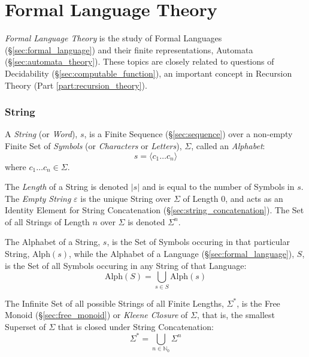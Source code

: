 \part{Formal Language Theory}\label{part:formal_language}
\cite{hammel03}

\emph{Formal Language Theory} is the study of Formal Languages
(\S\ref{sec:formal_language}) and their finite representations,
Automata (\S\ref{sec:automata_theory}). These topics are closely
related to questions of Decidability
(\S\ref{sec:computable_function}), an important concept in Recursion
Theory (Part \ref{part:recursion_theory}).



\section{String}\label{sec:string}

A \emph{String} (or \emph{Word}), $s$, is a Finite Sequence
(\S\ref{sec:sequence}) over a non-empty Finite Set of \emph{Symbols}
(or \emph{Characters} or \emph{Letters}), $\Sigma$, called an
\emph{Alphabet}:
\[
  s = \langle c_1 \ldots c_n \rangle
\]
where $c_1 \ldots c_n \in \Sigma$.

The \emph{Length} of a String is denoted $|s|$ and is equal to the
number of Symbols in $s$. The \emph{Empty String} $\varepsilon$ is the
unique String over $\Sigma$ of Length 0, and acts as an Identity
Element for String Concatenation (\S\ref{sec:string_concatenation}).
The Set of all Strings of Length $n$ over $\Sigma$ is denoted
$\Sigma^n$.

The Alphabet of a String, $s$, is the Set of Symbols occuring in that
particular String, $\mathrm{Alph}(s)$, while the Alphabet of a
Language (\S\ref{sec:formal_language}), $S$, is the Set of all Symbols
occuring in any String of that Language:
\[
  \mathrm{Alph}(S) = \bigcup_{s \in S} \mathrm{Alph}(s)
\]

The Infinite Set of all possible Strings of all Finite Lengths,
$\Sigma^*$, is the Free Monoid (\S\ref{sec:free_monoid}) or
\emph{Kleene Closure} of $\Sigma$, that is, the smallest Superset of
$\Sigma$ that is closed under String Concatenation:
\[
  \Sigma^* = \bigcup_{n\in\mathbb{N}_0} \Sigma^n
\]



